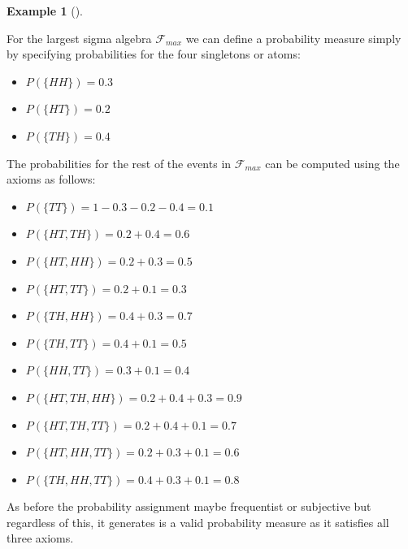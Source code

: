 \documentclass[
  letterpaper,
  DIV=11,
  numbers=noendperiod]{scrreport}
\providecommand{\tightlist}{%
  \setlength{\itemsep}{0pt}\setlength{\parskip}{0pt}}
\theoremstyle{definition}
\newtheorem{example}{Example}[chapter]
\theoremstyle{plain}
\theoremstyle{plain}
\theoremstyle{definition}
\theoremstyle{remark}
\begin{document}
\begin{tcolorbox}[enhanced jigsaw, opacitybacktitle=0.6, bottomtitle=1mm, opacityback=0, toprule=.15mm, colbacktitle=quarto-callout-note-color!10!white, colback=white, left=2mm, title={Probability measure for power set}, breakable, rightrule=.15mm, leftrule=.75mm, titlerule=0mm, colframe=quarto-callout-note-color-frame, arc=.35mm, coltitle=black, toptitle=1mm, bottomrule=.15mm]

\begin{example}[]\protect\hypertarget{exm-probability-measure-power-set}{}\label{exm-probability-measure-power-set}

For the largest sigma algebra \(\mathcal F_{max}\) we can define a
probability measure simply by specifying probabilities for the four
singletons or atoms:

\begin{itemize}
\tightlist
\item
  \(P(\{HH\}) = 0.3\)
\item
  \(P(\{HT\}) = 0.2\)
\item
  \(P(\{TH\}) = 0.4\)
\end{itemize}

The probabilities for the rest of the events in \(\mathcal F_{max}\) can
be computed using the axioms as follows:

\begin{itemize}
\tightlist
\item
  \(P(\{TT\}) = 1-0.3-0.2-0.4 = 0.1\)
\item
  \(P(\{HT,TH\}) = 0.2 + 0.4 = 0.6\)
\item
  \(P(\{HT,HH\}) = 0.2 + 0.3 = 0.5\)
\item
  \(P(\{HT,TT\}) = 0.2 + 0.1 = 0.3\)
\item
  \(P(\{TH,HH\}) = 0.4 + 0.3 = 0.7\)
\item
  \(P(\{TH,TT\}) = 0.4 + 0.1 = 0.5\)
\item
  \(P(\{HH,TT\}) = 0.3 + 0.1 = 0.4\)
\item
  \(P(\{HT,TH,HH\}) = 0.2 + 0.4 + 0.3 = 0.9\)
\item
  \(P(\{HT,TH,TT\}) = 0.2 + 0.4 + 0.1 = 0.7\)
\item
  \(P(\{HT,HH,TT\}) = 0.2 + 0.3 + 0.1 = 0.6\)
\item
  \(P(\{TH,HH,TT\}) = 0.4 + 0.3 + 0.1 = 0.8\)
\end{itemize}

As before the probability assignment maybe frequentist or subjective but
regardless of this, it generates is a valid probability measure as it
satisfies all three axioms.

\end{example}

\end{tcolorbox}
\end{document}
